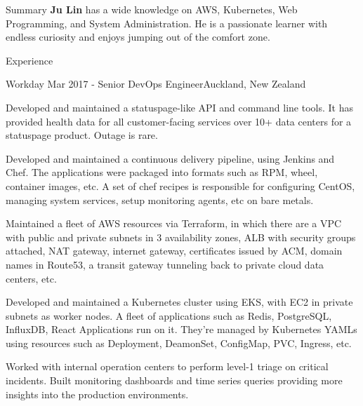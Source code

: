 \documentclass{resume}
\begin{document}
  \begin{rSection}{Summary}
    { {\bf Ju Lin } has a wide knowledge on AWS, Kubernetes, Web Programming, and System Administration. He is a passionate learner with endless curiosity and enjoys jumping out of the comfort zone. }
  \end{rSection}

  \begin{rSection}{Experience}

    \begin{rSubsection}{Workday}{ Mar 2017 - }{Senior DevOps Engineer}{Auckland, New Zealand}
    \item Developed and maintained a statuspage-like API and command line tools. It has provided health data for all customer-facing services over 10+ data centers for a statuspage product. Outage is rare.
    \item Developed and maintained a continuous delivery pipeline, using Jenkins and Chef. The applications were packaged into formats such as RPM, wheel, container images, etc. A set of chef recipes is responsible for configuring CentOS, managing system services, setup monitoring agents, etc on bare metals.
    \item Maintained a fleet of AWS resources via Terraform, in which there are a VPC with public and private subnets in 3 availability zones, ALB with security groups attached, NAT gateway, internet gateway, certificates issued by ACM, domain names in Route53, a transit gateway tunneling back to private cloud data centers, etc.
    \item Developed and maintained a Kubernetes cluster using EKS, with EC2 in private subnets as worker nodes. A fleet of applications such as Redis, PostgreSQL, InfluxDB, React Applications run on it. They're managed by Kubernetes YAMLs using resources such as Deployment, DeamonSet, ConfigMap, PVC, Ingress, etc.
    \item Worked with internal operation centers to perform level-1 triage on critical incidents. Built monitoring dashboards and time series queries providing more insights into the production environments.
    \end{rSubsection}


\end{rSection}
\end{document}
